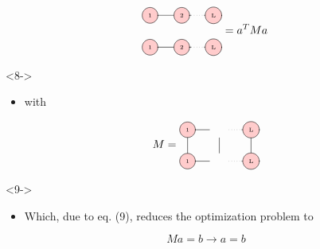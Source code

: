 \documentclass[aspectratio=169]{beamer}
\begin{document}
\begin{frame}
\begin{onlyenv}
\begin{equation}
\begin{tikzpicture}[baseline={([yshift=-.5ex]current bounding box.center)}]
        \draw[gray, thick] (0,0) -- (1.3,0);
        \draw[gray, dotted] (1.3,0) -- (1.7,0);
        \draw[gray, thick] (1.7,0) -- (2.0,0);
      
        \draw[gray, thick] (0,-1) -- (1.3,-1);
        \draw[gray, dotted] (1.3,-1) -- (1.7,-1);
        \draw[gray, thick] (1.7,-1) -- (2.0,-1);
      
        \node[draw, circle, line cap=round, fill=red!20] at (0,0) {\tiny 1};
        \node[draw, circle, line cap=round, fill=red!20] at (1,0) {\tiny 2};
        \node[draw, circle, line cap=round, fill=red!20] at (2,0) {\tiny L};
      
        \node[draw, circle, line cap=round, fill=red!20] at (0,-1) {\tiny 1};
        \node[draw, circle, line cap=round, fill=red!20] at (1,-1) {\tiny 2};
        \node[draw, circle, line cap=round, fill=red!20] at (2,-1) {\tiny L};    
      \end{tikzpicture} = a^T M a \thinspace
    \end{equation}
  \end{onlyenv}
  \begin{onlyenv}<8->
    \begin{itemize}
      \item with
    \end{itemize}
       \begin{equation}
        M = \begin{tikzpicture}[baseline={([yshift=-.5ex]current bounding box.center)}]
        \draw[gray, thick] (0,0) -- (0,-1);
        \draw[gray, thick] (1,-0.25) -- (1,-0.75);
        \draw[gray, thick] (2,0) -- (2,-1);
    
        \draw[gray, thick] (0,0) -- (0.7,0);
        \draw[gray, dotted] (1.3,0) -- (1.7,0);
        \draw[gray, thick] (1.7,0) -- (2.0,0);
    
        \draw[gray, thick] (0,-1) -- (0.7,-1);
        \draw[gray, dotted] (1.3,-1) -- (1.7,-1);
        \draw[gray, thick] (1.7,-1) -- (2.0,-1);
    
        \node[draw, circle, line cap=round, fill=red!20] at (0,0) {\tiny 1};
        \node[draw, circle, line cap=round, fill=red!20] at (2,0) {\tiny L};
    
        \node[draw, circle, line cap=round, fill=red!20] at (0,-1) {\tiny 1};
        \node[draw, circle, line cap=round, fill=red!20] at (2,-1) {\tiny L};
      \end{tikzpicture} 
    \end{equation}
  \end{onlyenv}
  \begin{onlyenv}<9->
    \begin{itemize}
      \item Which, due to eq. (9), reduces the optimization problem to 
    \end{itemize}
    \begin{equation}
      Ma = b \rightarrow a = b
    \end{equation}
  \end{onlyenv}
\end{frame}
\end{document}

